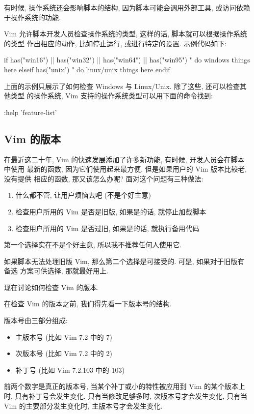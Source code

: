 有时候, 操作系统还会影响脚本的结构, 因为脚本可能会调用外部工具, 或访问依赖
于操作系统的功能.

Vim 允许脚本开发人员检查操作系统的类型, 这样的话, 脚本就可以根据操作系统的类型
作出相应的动作, 比如停止运行, 或进行特定的设置. 示例代码如下:
\begin{vimcode}
if has("win16") || has("win32") || has("win64") || has("win95")
	" do windows things here
elseif has("unix")
	" do linux/unix things here
endif
\end{vimcode}
上面的示例只展示了如何检查 Windows 与 Linux/Unix. 除了这些, 还可以检查其他类型
的操作系统, Vim 支持的操作系统类型可以用下面的命令找到:
\begin{vimcode}
:help 'feature-list'
\end{vimcode}

\subsection{Vim 的版本}
\label{subsec:which_version_of_vim}

在最近这二十年, Vim 的快速发展添加了许多新功能, 有时候, 开发人员会在脚本中使用
最新的函数, 因为它们使用起来最方便. 但是如果用户的 Vim 版本比较老, 没有提供
相应的函数, 那又该怎么办呢?
面对这个问题有三种做法:
\begin{enumerate}
    \item 什么都不管, 让用户烦恼去吧 (不是个好主意)
    \item 检查用户所用的 Vim 是否是旧版, 如果是的话, 就停止加载脚本
    \item 检查用户所用的 Vim 是否过旧, 如果是的话, 就执行备用代码
\end{enumerate}

第一个选择实在不是个好主意, 所以我不推荐任何人使用它.

如果脚本无法处理旧版 Vim, 那么第二个选择是可接受的. 可是, 如果对于旧版有备选
方案可供选择, 那就最好用上.

现在讨论如何检查 Vim 的版本.

在检查 Vim 的版本之前, 我们得先看一下版本号的结构.

版本号由三部分组成:
\begin{itemize}
    \item 主版本号 (比如 Vim 7.2 中的 7)
    \item 次版本号 (比如 Vim 7.2 中的 2)
    \item 补丁号 (比如 Vim 7.2.103 中的 103)
\end{itemize}
前两个数字是真正的版本号, 当某个补丁或小的特性被应用到 Vim 的某个版本上时,
只有补丁号会发生变化. 只有当修改足够多时, 次版本号才会发生变化, 只有当 Vim
的主要部分发生变化时, 主版本号才会发生变化.

